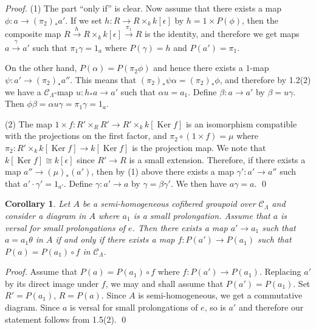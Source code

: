 \documentclass[11pt]{article}
\theoremstyle{plain}
\newtheorem{corollary}[theorem]{Corollary}
\theoremstyle{definition}
\theoremstyle{remark}
\DeclareMathOperator{\Ker}{Ker}
\begin{document}
\begin{proof}
(1) The part ``only if'' is clear. Now assume that there exists a map $\phi: a \to (\pi_2)_* a'$. If we set $h: R \to R \times_k k[\epsilon]$ by $h = 1 \times P(\phi)$, then the composite map $R \xrightarrow{h} R \times_k k[\epsilon] \xrightarrow{\pi_1} R$ is the identity, and therefore we get maps $a \xrightarrow{\gamma} a'$ such that $\pi_1\gamma = 1_a$ where $P(\gamma) = h$ and $P(a') = \pi_1$.

On the other hand, $P(\alpha) = P(\pi_2\phi)$ and hence there exists a $1$-map $\psi: a' \to (\pi_2)_* a''$. This means that $(\pi_2)_*\psi\alpha = (\pi_2)_*\phi$, and therefore by 1.2(2) we have a $\mathcal{C}_\Lambda$-map $u: h_* a \to a'$ such that $\alpha u = a_1$. Define $\beta: a \to a'$ by $\beta = u\gamma$. Then $\phi\beta = \alpha u \gamma = \pi_1\gamma = 1_a$.

(2) The map $1 \times f: R' \times_R R' \to R' \times_k k[\Ker f]$ is an isomorphism compatible with the projections on the first factor, and $\pi_2 \circ (1 \times f) = \mu$ where $\pi_2: R' \times_k k[\Ker f] \to k[\Ker f]$ is the projection map. We note that $k[\Ker f] \cong k[\epsilon]$ since $R' \to R$ is a small extension. Therefore, if there exists a map $a'' \to (\mu)_*(a')$, then by (1) above there exists a map $\gamma': a' \to a''$ such that $a' \cdot \gamma' = 1_{a'}$. Define $\gamma: a' \to a$ by $\gamma = \beta\gamma'$. We then have $a\gamma = a$.
\qed\end{proof}

\begin{corollary}
Let $A$ be a semi-homogeneous cofibered groupoid over $\mathcal{C}_\Lambda$ and consider a diagram in $A$ where $a_1$ is a small prolongation. Assume that $a$ is versal for small prolongations of $e$. Then there exists a map $a' \to a_1$ such that $a = a_1\theta$ in $A$ if and only if there exists a map $f: P(a') \to P(a_1)$ such that $P(a) = P(a_1) \circ f$ in $\mathcal{C}_\Lambda$.
\end{corollary}

\begin{proof}
Assume that $P(a) = P(a_1) \circ f$ where $f: P(a') \to P(a_1)$. Replacing $a'$ by its direct image under $f$, we may and shall assume that $P(a') = P(a_1)$. Set $R' = P(a_1)$, $R = P(a)$. Since $A$ is semi-homogeneous, we get a commutative diagram. Since $a$ is versal for small prolongations of $e$, so is $a'$ and therefore our statement follows from 1.5(2).
\qed\end{proof}
\end{document}
